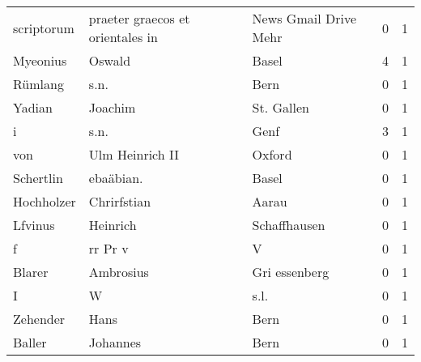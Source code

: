 \documentclass[10pt,a4paper,landscape]{article}
\begin{document}
\begin{longtable}{llllrr}
               scriptorum &   praeter graecos et orientales in &             &                       News Gmail Drive Mehr &          0 &         1 \\
                 Myeonius &                             Oswald &             &                                       Basel &          4 &         1 \\
                  Rümlang &                               s.n. &             &                                        Bern &          0 &         1 \\
                   Yadian &                            Joachim &             &                                  St. Gallen &          0 &         1 \\
                        i &                               s.n. &             &                                        Genf &          3 &         1 \\
                      von &                    Ulm Heinrich II &             &                                      Oxford &          0 &         1 \\
                Schertlin &                          ebaäbian. &             &                                       Basel &          0 &         1 \\
               Hochholzer &                        Chrirfstian &             &                                       Aarau &          0 &         1 \\
                  Lfvinus &                           Heinrich &             &                                Schaffhausen &          0 &         1 \\
                        f &                            rr Pr v &             &                                           V &          0 &         1 \\
                   Blarer &                          Ambrosius &             &                               Gri essenberg &          0 &         1 \\
                        I &                                  W &             &                                        s.l. &          0 &         1 \\
                 Zehender &                               Hans &             &                                        Bern &          0 &         1 \\
                   Baller &                           Johannes &             &                                        Bern &          0 &         1 \\

\end{longtable}
\end{document}
